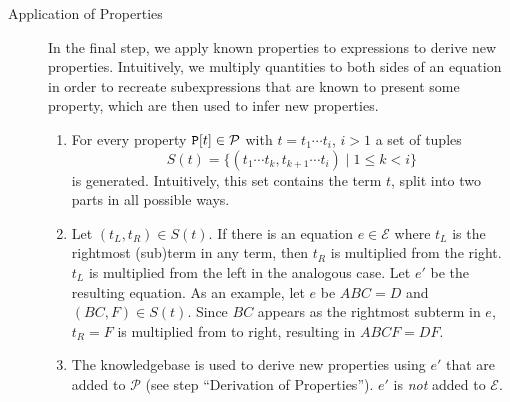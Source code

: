 \begin{description}
\item[Application of Properties] In the final step, we apply known properties to expressions to derive new properties. Intuitively, we multiply quantities to both sides of an equation in order to recreate subexpressions that are known to present some property, which are then used to infer new properties.
\begin{enumerate}
\item For every property $\text{\ttfamily P}[t] \in \mathcal{P}$ with $t = t_1 \cdots t_i$, $i > 1$ a set of tuples $$S(t) = \{ (t_1 \cdots t_k, t_{k + 1} \cdots t_i) \mid 1 \leq k < i \} $$ is generated. Intuitively, this set contains the term $t$, split into two parts in all possible ways.
\item Let $(t_L, t_R) \in S(t)$. If there is an equation $e \in \mathcal{E}$ where $t_L$ is the rightmost (sub)term in any term, then $t_R$ is multiplied from the right. $t_L$ is multiplied from the left in the analogous case. Let $e'$ be the resulting equation. As an example, let $e$ be $ABC = D$ and $(BC, F) \in S(t)$. Since $BC$ appears as the rightmost subterm in $e$, $t_R = F$ is multiplied from to right, resulting in $ABCF = DF$.
\item The knowledgebase is used to derive new properties using $e'$ that are added to $\mathcal{P}$ (see step ``Derivation of Properties''). $e'$ is \emph{not} added to $\mathcal{E}$.
\end{enumerate}


%
%


\end{description}
